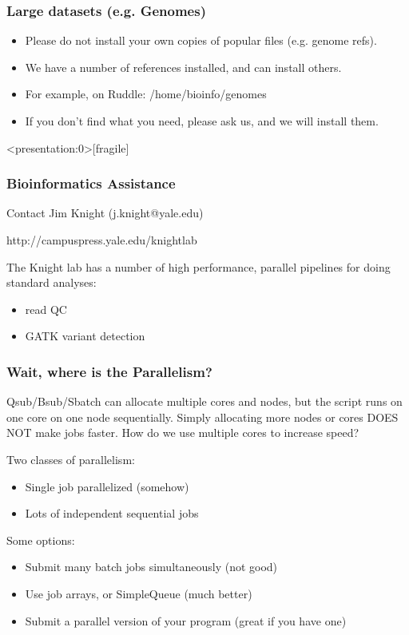 \documentclass[10pt]{beamer}
\begin{document}
\begin{frame}[fragile]
\frametitle{Large datasets (e.g. Genomes)}

\begin{itemize}
\item Please do not install your own copies of popular files (e.g. genome refs).  
\item We have a number of references installed, and can install others.
\item For example, on Ruddle: /home/bioinfo/genomes
\item If you don't find what you need, please ask us, and we will install them.
\end{itemize}
\end{frame}

\begin{frame}<presentation:0>[fragile]
\frametitle{Bioinformatics Assistance}

Contact Jim Knight (j.knight@yale.edu)

http://campuspress.yale.edu/knightlab

The Knight lab has a number of high performance, parallel pipelines for
doing standard analyses:

\begin{itemize}
\item read QC
\item GATK variant detection
\end{itemize}
\end{frame}


\begin{frame}[fragile]
\frametitle{Wait, where is the Parallelism?}

Qsub/Bsub/Sbatch can allocate multiple cores and nodes, but the script runs on one core on one node sequentially.  
\vspace{0.1in}
Simply allocating more nodes or cores DOES NOT make jobs faster.
\vspace{.1in}
How do we use multiple cores to increase speed?

Two classes of parallelism:
\begin{itemize}
\item Single job parallelized (somehow)
\item Lots of independent sequential jobs
\end{itemize}

Some options:
\begin{itemize}
\item Submit many batch jobs simultaneously (not good)
\item Use job arrays, or SimpleQueue (much better)
\item Submit a parallel version of your program (great if you have one)
\end{itemize}

\end{frame}
\end{document}

